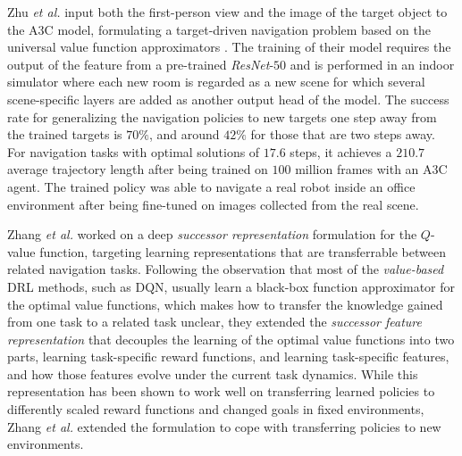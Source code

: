 Zhu \textit{et al.} \cite{zhu2017target} input both the first-person view and the image of the target object to the A3C model,
formulating a target-driven navigation problem based on the universal value function approximators \cite{schaul2015universal}.
The training of their model requires the output of the feature from a pre-trained \textit{ResNet}-$50$ \cite{he2016deep} and is performed in an indoor simulator \cite{kolve2017ai2}
where each new room is regarded as a new scene for which several scene-specific layers are added as another output head of the model.
The success rate for generalizing the navigation policies to new targets one step away from the trained targets is $70\%$,
and around $42\%$ for those that are two steps away.
For navigation tasks with optimal solutions of $17.6$ steps,
it achieves a $210.7$ average trajectory length after being trained on $100$ million frames with an A3C agent.
The trained policy was able to navigate a real robot inside an office environment after being fine-tuned on images collected from the real scene.

Zhang \textit{et al.} \cite{zhang2017deep} worked on a deep \textit{successor representation} formulation \cite{barreto2017successor, kulkarni2016deep} for the $Q$-value function,
targeting learning representations that are transferrable between related navigation tasks.
Following the observation that most of the \textit{value-based} DRL methods, such as DQN,
usually learn a black-box function approximator for the optimal value functions,
which makes how to transfer the knowledge gained from one task to a related task unclear,
they extended the \textit{successor feature representation} that decouples the learning of the optimal value functions into two parts,
learning task-specific reward functions, and learning task-specific features, and how those features evolve under the current task dynamics.
While this representation has been shown to work well on transferring learned policies to differently scaled reward functions and changed goals in fixed environments,
Zhang \textit{et al.} \cite{zhang2017deep} extended the formulation to cope with transferring policies to new environments.
